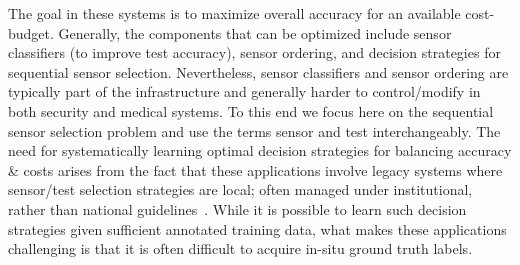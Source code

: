 %
The goal in these systems is to maximize overall accuracy for an available cost-budget. Generally, the components that can be optimized include sensor classifiers (to improve test accuracy), sensor ordering, and decision strategies for sequential sensor selection. Nevertheless, sensor classifiers and sensor ordering are typically part of the infrastructure and generally harder to control/modify in both security and medical systems. To this end we focus here  on the sequential sensor selection problem and use the terms sensor and test interchangeably. The need for systematically learning optimal decision strategies for balancing accuracy \& costs arises from the fact that these applications involve legacy systems where sensor/test selection strategies are local; often managed under institutional, rather than national guidelines~\cite{baghdadian}. %
While it is possible to learn such decision strategies given sufficient annotated training data, what makes these applications challenging is that it is often difficult to acquire in-situ ground truth labels. 

